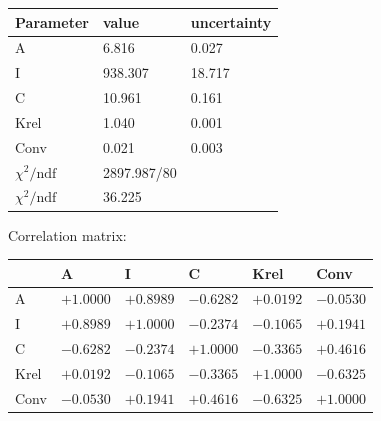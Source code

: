 \begin{tabular}{l|ll}
Parameter & value & uncertainty \\ \hline
 A & 6.816 & 0.027 \\ 
 I & 938.307 & 18.717 \\ 
 C & 10.961 & 0.161 \\ 
 Krel & 1.040 & 0.001 \\ 
 Conv & 0.021 & 0.003 \\ 
 \hline
 $\chi^2/\mathrm{ndf}$ & 2897.987/80 & \\
 $\chi^2/\mathrm{ndf}$ & 36.225 & \\
\end{tabular}

Correlation matrix:

\begin{tabular}{l|lllll} 
 & A & I & C & Krel & Conv \\ \hline
 A & $+1.0000$ & $+0.8989$ & $-0.6282$ & $+0.0192$ & $-0.0530$ \\ 
 I & $+0.8989$ & $+1.0000$ & $-0.2374$ & $-0.1065$ & $+0.1941$ \\ 
 C & $-0.6282$ & $-0.2374$ & $+1.0000$ & $-0.3365$ & $+0.4616$ \\ 
 Krel & $+0.0192$ & $-0.1065$ & $-0.3365$ & $+1.0000$ & $-0.6325$ \\ 
 Conv & $-0.0530$ & $+0.1941$ & $+0.4616$ & $-0.6325$ & $+1.0000$ \\ 
\end{tabular}
